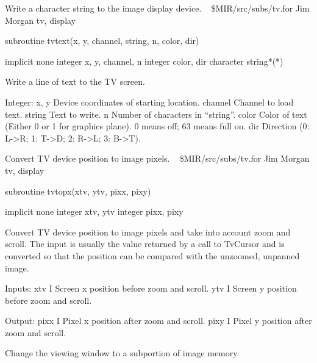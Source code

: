 %
\noindent Write a character string to the image display device.
\newline \ 
\newline {} \$MIR/src/subs/tv.for
\newline {} Jim Morgan
\newline {} tv, display
\par{\tenpoint
{\eightpoint\begintt
      subroutine tvtext(x, y, channel, string, n, color, dir)

      implicit none
      integer x, y, channel, n
      integer color, dir
      character string*(*)

  Write a line of text to the TV screen.

  Integer:
     x, y      Device coordinates of starting location.
     channel   Channel to load text.
     string    Text to write.
     n         Number of characters in ``string''.
     color     Color of text (Either 0 or 1 for graphics plane).
               0 means off; 63 means full on.
     dir       Direction (0: L->R; 1: T->D; 2: R->L; 3: B->T).
\endtt}
\par}
%
\noindent Convert TV device position to image pixels.
\newline \ 
\newline {} \$MIR/src/subs/tv.for
\newline {} Jim Morgan
\newline \abox{Keywords:} tv, display
\par{\tenpoint
{\eightpoint\begintt
      subroutine tvtopx(xtv, ytv, pixx, pixy)

      implicit none
      integer xtv, ytv
      integer pixx, pixy

  Convert TV device position to image pixels and take into account
  zoom and scroll.  The input is usually the value returned by a
  call to TvCursor and is converted so that the position can be
  compared with the unzoomed, unpanned image.

  Inputs:
    xtv     I     Screen x position before zoom and scroll.
    ytv     I     Screen y position before zoom and scroll.

  Output:
    pixx    I     Pixel x position after zoom and scroll.
    pixy    I     Pixel y position after zoom and scroll.
\endtt}
\par}
%
\noindent Change the viewing window to a subportion of image memory.
\newline \ 
